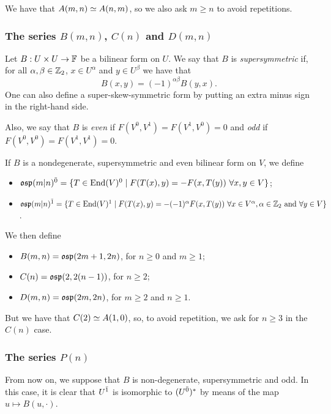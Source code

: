 We have that $A(m,n)\simeq A(n,m)$, so we also ask $m\geq n$ to avoid repetitions.

\subsubsection{The series $B(m,n)$, $C(n)$ and $D(m,n)$}

Let $B:U\times U \rightarrow \mathbb{F}$ be a bilinear form on $U$. We say that $B$ is \emph{supersymmetric} if, for all $\alpha,\beta\in\mathbb{Z}_{2}$, $x\in U^{\alpha}$ and $y\in U^{\beta}$ we have that
\[B(x,y) = (-1)^{\alpha\beta}B(y,x).\]
One can also define a super-skew-symmetric form by putting an extra minus sign in the right-hand side. 

Also, we say that $B$ is \emph{even} if $F(V^0,V^1) = F(V^1,V^0)=0$ and \emph{odd} if $F(V^0,V^0) = F(V^1,V^1)=0$.

If $B$ is a nondegenerate, supersymmetric and even bilinear form on $V$, we define

\begin{itemize}
	\item $\mathfrak{osp}(m|n)^{\bar0} = \{T\in \operatorname{End} (V)^{0} \mid F(T(x),y) = - F(x,T   (y))\,\, \forall x,y\in V\}$;
	\item $\mathfrak{osp}(m|n)^{\bar1} = \{T\in \operatorname{End} (V)^{1} \mid F(T(x),y) = -(-1)^{\alpha} F(x,T(y))
		      \,\, \forall x\in V^{\alpha}, \alpha\in\mathbb{Z}_2 \text{ and } \forall y\in V\}$.
\end{itemize}

We then define

\begin{itemize}
	\item $B(m,n) = \mathfrak{osp}(2m+1,2n)$, for $n\geq 0$ and $m\geq 1$;
	\item $C(n) = \mathfrak{osp}(2, 2(n-1))$, for $n\geq 2$;
	\item $D(m,n) = \mathfrak{osp}(2m,2n)$, for $m\geq 2$ and $n\geq 1$.
\end{itemize}
But we have that $C(2)\simeq A(1,0)$, so, to avoid repetition, we ask for $n\geq 3$ in the $C(n)$ case.

\subsubsection{The series $P(n)$}
From now on, we suppose that $B$ is non-degenerate, supersymmetric and odd. In this case, it is clear that $U^{\bar1}$ is isomorphic to $(U^{\bar0})^*$ by means of the map $u \mapsto B(u, \cdot)$. %

